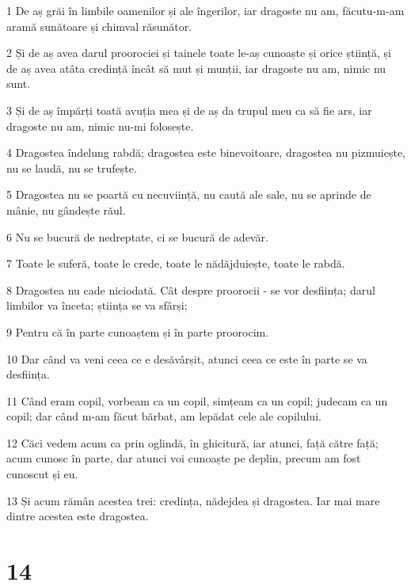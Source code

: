\par 1 De aș grăi în limbile oamenilor și ale îngerilor, iar dragoste nu am, făcutu-m-am aramă sunătoare și chimval răsunător.
\par 2 Și de aș avea darul proorociei și tainele toate le-aș cunoaște și orice știință, și de aș avea atâta credință încât să mut și munții, iar dragoste nu am, nimic nu sunt.
\par 3 Și de aș împărți toată avuția mea și de aș da trupul meu ca să fie ars, iar dragoste nu am, nimic nu-mi folosește.
\par 4 Dragostea îndelung rabdă; dragostea este binevoitoare, dragostea nu pizmuiește, nu se laudă, nu se trufește.
\par 5 Dragostea nu se poartă cu necuviință, nu caută ale sale, nu se aprinde de mânie, nu gândește răul.
\par 6 Nu se bucură de nedreptate, ci se bucură de adevăr.
\par 7 Toate le suferă, toate le crede, toate le nădăjduiește, toate le rabdă.
\par 8 Dragostea nu cade niciodată. Cât despre proorocii - se vor desființa; darul limbilor va înceta; știința se va sfârși;
\par 9 Pentru că în parte cunoaștem și în parte proorocim.
\par 10 Dar când va veni ceea ce e desăvârșit, atunci ceea ce este în parte se va desființa.
\par 11 Când eram copil, vorbeam ca un copil, simțeam ca un copil; judecam ca un copil; dar când m-am făcut bărbat, am lepădat cele ale copilului.
\par 12 Căci vedem acum ca prin oglindă, în ghicitură, iar atunci, față către față; acum cunosc în parte, dar atunci voi cunoaște pe deplin, precum am fost cunoscut și eu.
\par 13 Și acum rămân acestea trei: credința, nădejdea și dragostea. Iar mai mare dintre acestea este dragostea.

\chapter{14}

